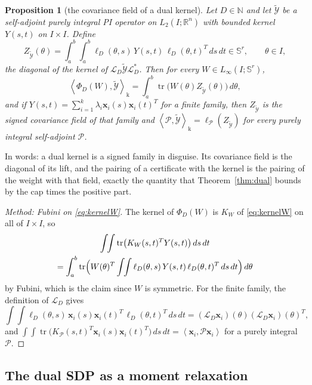 \documentclass[12pt]{article}
\newcommand{\R}{\mathbb{R}}
\newcommand{\N}{\mathbb{N}}
\newcommand{\Sym}[1]{\mathbb{S}^{#1}}
\newcommand{\mcl}[1]{\mathcal{#1}}
\newcommand{\mbf}[1]{\mathbf{#1}}
\newcommand{\mrm}[1]{\mathrm{#1}}
\newcommand{\ip}[2]{\left\langle #1,#2\right\rangle}
\DeclareMathOperator{\tr}{tr}
\theoremstyle{plain}
\newtheorem{proposition}[theorem]{Proposition}
\theoremstyle{definition}
\theoremstyle{remark}
\begin{document}
\begin{proposition}[the covariance field of a dual kernel]\label{prop:field}
Let $D\in\N$ and let $\widetilde{\mcl Y}$ be a self-adjoint purely integral PI operator on $L_2(I;\R^n)$ with bounded kernel $Y(s,t)$ on $I\times I$. Define
\[
Z_{\widetilde{\mcl Y}}(\theta)=\int_a^b\!\!\int_a^b\ell_D(\theta,s)\,Y(s,t)\,\ell_D(\theta,t)^T\,ds\,dt\in\Sym r,\qquad\theta\in I,
\]
the diagonal of the kernel of $\mcl L_D\widetilde{\mcl Y}\mcl L_D^*$. Then for every $W\in L_\infty(I;\Sym r)$,
\[
\ip{\Phi_D(W)}{\widetilde{\mcl Y}}_{\mrm k}=\int_a^b\tr\bigl(W(\theta)Z_{\widetilde{\mcl Y}}(\theta)\bigr)\,d\theta ,
\]
and if $Y(s,t)=\sum_{i=1}^k\lambda_i\mbf x_i(s)\mbf x_i(t)^T$ for a finite family, then $Z_{\widetilde{\mcl Y}}$ is the signed covariance field of that family and $\ip{\mcl P}{\widetilde{\mcl Y}}_{\mrm k}=\ell_{\mcl P}(Z_{\widetilde{\mcl Y}})$ for every purely integral self-adjoint $\mcl P$.
\end{proposition}
In words: a dual kernel is a signed family in disguise. Its covariance field is the diagonal of its lift, and the pairing of a certificate with the kernel is the pairing of the weight with that field, exactly the quantity that Theorem~\ref{thm:dual} bounds by the cap times the positive part.
\begin{proof}[Method: Fubini on \eqref{eq:kernelW}]
The kernel of $\Phi_D(W)$ is $K_W$ of \eqref{eq:kernelW} on all of $I\times I$, so
\begin{multline*}
\int\!\!\int\tr\bigl(K_W(s,t)^TY(s,t)\bigr)\,ds\,dt\\
=\int_a^b\tr\Bigl(W(\theta)^T\int\!\!\int\ell_D(\theta,s)\,Y(s,t)\,\ell_D(\theta,t)^T\,ds\,dt\Bigr)\,d\theta
\end{multline*}
by Fubini, which is the claim since $W$ is symmetric. For the finite family, the definition of $\mcl L_D$ gives
\[
\int\!\!\int\ell_D(\theta,s)\,\mbf x_i(s)\mbf x_i(t)^T\,\ell_D(\theta,t)^T\,ds\,dt=(\mcl L_D\mbf x_i)(\theta)(\mcl L_D\mbf x_i)(\theta)^T,
\]
and $\int\!\!\int\tr\bigl(K_{\mcl P}(s,t)^T\mbf x_i(s)\mbf x_i(t)^T\bigr)\,ds\,dt=\ip{\mbf x_i}{\mcl P\mbf x_i}$ for a purely integral $\mcl P$.
\end{proof}

\subsection{The dual SDP as a moment relaxation}
\end{document}
